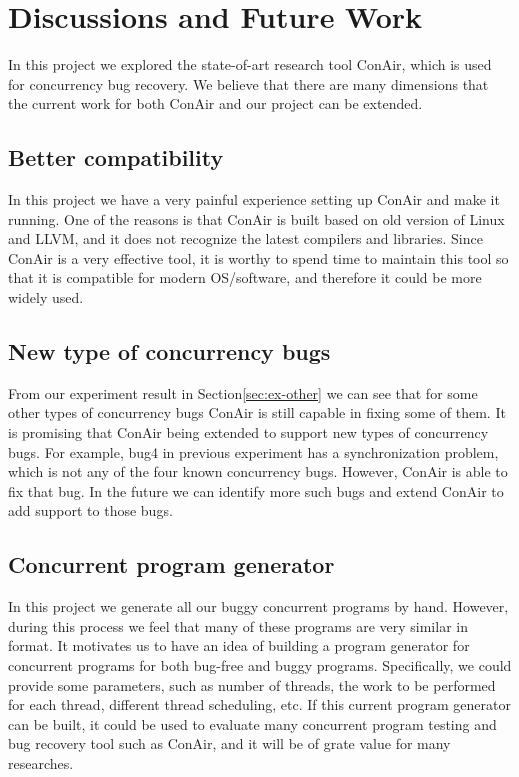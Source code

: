 \section{Discussions and Future Work}
In this project we explored the state-of-art research tool ConAir, which is used
for concurrency bug recovery. We believe that there are many dimensions that the
  current work for both ConAir and our project can be extended.

\subsection{Better compatibility}
In this project we have a very painful experience setting up ConAir and make it
running. One of the reasons is that ConAir is built based on old version of
Linux and LLVM, and it does not recognize the latest compilers and libraries.
Since ConAir is a very effective tool, it is worthy to spend time to maintain
this tool so that it is compatible for modern OS/software, and therefore it
could be more widely used.

\subsection{New type of concurrency bugs}
From our experiment result in Section\ref{sec:ex-other} we can see that for some
other types of concurrency bugs ConAir is still capable in fixing some of them.
It is promising that ConAir being extended to support new types of concurrency
bugs. For example, bug4 in previous experiment has a synchronization problem,
which is not any of the four known concurrency bugs. However, ConAir is able to
fix that bug. In the future we can identify more such bugs and extend ConAir to
add support to those bugs.

\subsection{Concurrent program generator}
In this project we generate all our buggy concurrent programs by hand. However,
during this process we feel that many of these programs are very similar in
format. It motivates us to have an idea of building a program generator for
concurrent programs for both bug-free and buggy programs. Specifically, we could
provide some parameters, such as number of threads, the work to be performed for
each thread, different thread scheduling, etc. If this current program generator
can be built, it could be used to evaluate many concurrent program testing and
bug recovery tool such as ConAir, and it will be of grate value for many
researches.
